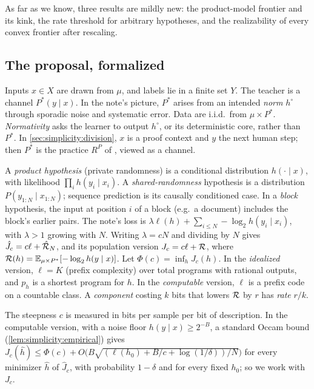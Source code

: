 As far as we know, three results are mildly new: the product-model frontier and its kink, the rate threshold for arbitrary hypotheses, and the realizability of every convex frontier after rescaling.

\subsection{The proposal, formalized}\label{sec:simplicity:setup}

Inputs $x\in X$ are drawn from $\mu$, and labels lie in a finite set $Y$. The teacher is a channel $P^*(y\mid x)$. In the note's picture, $P^*$ arises from an intended \emph{norm} $h^\circ$ through sporadic noise and systematic error. Data are i.i.d.\ from $\mu\times P^*$. \emph{Normativity} asks the learner to output $h^\circ$, or its deterministic core, rather than $P^*$. In \cref{sec:simplicity:division}, $x$ is a proof context and $y$ the next human step; then $P^*$ is the practice $R^P$ of , viewed as a channel.

\begin{definition}\label{def:simplicity:objective}
A \emph{product hypothesis} (private randomness) is a conditional distribution $h(\cdot\mid x)$, with likelihood $\prod_ih(y_i\mid x_i)$. A \emph{shared-randomness} hypothesis is a distribution $P(y_{1:N}\mid x_{1:N})$; sequence prediction is its causally conditioned case. In a \emph{block} hypothesis, the input at position $i$ of a block (e.g.\ a document) includes the block's earlier pairs. The note's loss is $\lambda\ell(h)+\sum_{i\le N}-\log_2h(y_i\mid x_i)$, with $\lambda>1$ growing with $N$. Writing $\lambda=cN$ and dividing by $N$ gives $\hat J_c=c\ell+\hat{\mathcal R}_N$, and its population version $J_c=c\ell+\mathcal R$, where $\mathcal R(h)=\mathbb{E}_{\mu\times P^*}[-\log_2h(y\mid x)]$. Let $\Phi(c)=\inf_hJ_c(h)$. In the \emph{idealized} version, $\ell=K$ (prefix complexity) over total programs with rational outputs, and $p_h$ is a shortest program for $h$. In the \emph{computable} version, $\ell$ is a prefix code on a countable class. A \emph{component} costing $k$ bits that lowers $\mathcal R$ by $r$ has \emph{rate} $r/k$.
\end{definition}

The steepness $c$ is measured in bits per sample per bit of description. In the computable version, with a noise floor $h(y\mid x)\ge2^{-B}$, a standard Occam bound (\cref{lem:simplicity:empirical}) gives $J_c(\hat h)\le\Phi(c)+O\big(B\sqrt{(\ell(h_0)+B/c+\log(1/\delta))/N}\big)$ for every minimizer $\hat h$ of $\hat J_c$, with probability $1-\delta$ and for every fixed $h_0$; so we work with $J_c$.

